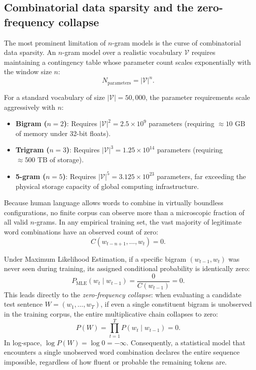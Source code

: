 \documentclass[../../main.tex]{subfiles}
\begin{document}
\subsection{Combinatorial data sparsity and the zero-frequency collapse}
\label{subsec:data_sparsity_zero_freq}

The most prominent limitation of $n$-gram models is the curse of combinatorial data sparsity. An $n$-gram model over a realistic vocabulary $\mathcal{V}$ requires maintaining a contingency table whose parameter count scales exponentially with the window size $n$:
\begin{equation}
N_{\text{parameters}} = |\mathcal{V}|^n.
\label{eq:ngram_parameter_explosion}
\end{equation}

For a standard vocabulary of size $|\mathcal{V}| = 50{,}000$, the parameter requirements scale aggressively with $n$:
\begin{itemize}
    \item \textbf{Bigram ($n=2$)}: Requires $|\mathcal{V}|^2 = 2.5 \times 10^9$ parameters (requiring $\approx 10\text{ GB}$ of memory under 32-bit floats).
    \item \textbf{Trigram ($n=3$)}: Requires $|\mathcal{V}|^3 = 1.25 \times 10^{14}$ parameters (requiring $\approx 500\text{ TB}$ of storage).
    \item \textbf{5-gram ($n=5$)}: Requires $|\mathcal{V}|^5 = 3.125 \times 10^{23}$ parameters, far exceeding the physical storage capacity of global computing infrastructure.
\end{itemize}

Because human language allows words to combine in virtually boundless configurations, no finite corpus can observe more than a microscopic fraction of all valid $n$-grams. In any empirical training set, the vast majority of legitimate word combinations have an observed count of zero:
\begin{equation}
C\left(w_{t-n+1}, \dots, w_t\right) = 0.
\end{equation}

Under Maximum Likelihood Estimation, if a specific bigram $(w_{t-1}, w_t)$ was never seen during training, its assigned conditional probability is identically zero:
\begin{equation}
P_{\text{MLE}}\left(w_t \mid w_{t-1}\right) = \frac{0}{C\left(w_{t-1}\right)} = 0.
\end{equation}
This leads directly to the \textit{zero-frequency collapse}: when evaluating a candidate test sentence $W = (w_1, \dots, w_T)$, if even a single constituent bigram is unobserved in the training corpus, the entire multiplicative chain collapses to zero:
\begin{equation}
P(W) = \prod_{t=1}^T P\left(w_t \mid w_{t-1}\right) = 0.
\end{equation}
In log-space, $\log P(W) = \log 0 = -\infty$. Consequently, a statistical model that encounters a single unobserved word combination declares the entire sequence impossible, regardless of how fluent or probable the remaining tokens are.
\end{document}
